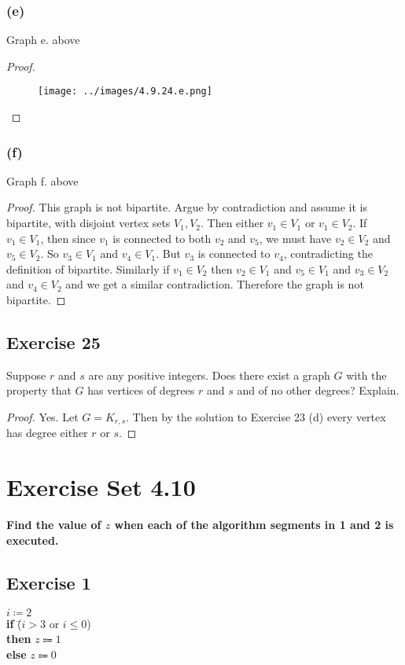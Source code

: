 \documentclass[14pt]{extarticle}
\newcommand{\cy}{\color{cyan}}
\begin{document}
\subsubsection{(e)}
Graph e. above

\begin{proof}
    \begin{figure}[ht!]
        \centering
        \texttt{[image: ../images/4.9.24.e.png]}
    \end{figure}
\end{proof}

\subsubsection{(f)}
Graph f. above

\begin{proof}
    This graph is not bipartite. Argue by contradiction and assume it is bipartite, with disjoint vertex sets $V_1, V_2$. Then either $v_1 \in V_1$ or $v_1 \in V_2$. If $v_1 \in V_1$, then since $v_1$ is connected to both $v_2$ and $v_5$, we must have $v_2 \in V_2$ and $v_5 \in V_2$. So $v_3 \in V_1$ and $v_4 \in V_1$. But $v_3$ is connected to $v_4$, contradicting the definition of bipartite. Similarly if $v_1 \in V_2$ then $v_2 \in V_1$ and $v_5 \in V_1$ and $v_3 \in V_2$ and $v_4 \in V_2$ and we get a similar contradiction. Therefore the graph is not bipartite.
\end{proof}

\subsection{Exercise 25}
Suppose $r$ and $s$ are any positive integers. Does there exist a graph $G$ with the property that $G$ has vertices of degrees $r$ and $s$ and of no other degrees? Explain.

\begin{proof}
    Yes. Let $G = K_{r,s}$. Then by the solution to Exercise 23 (d) every vertex has degree either $r$ or $s$.
\end{proof}

\section{Exercise Set 4.10}
 {\bf \cy Find the value of $z$ when each of the algorithm segments in 1 and 2 is executed.}

\subsection{Exercise 1}
\begin{tabbing}
    $i \coloneqq 2$ \\
    {\bf if} \= ($i > 3$ or $i \leq 0$) \\
    \> {\bf then} $z \Coloneqq 1$ \\
    \> {\bf else} $z \Coloneqq 0$
\end{tabbing}
\end{document}
